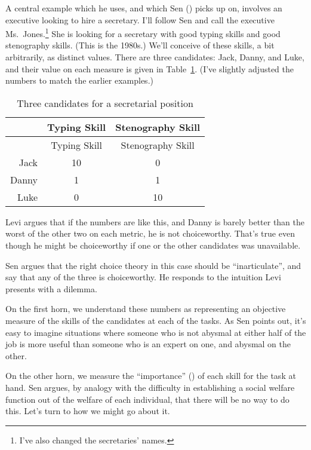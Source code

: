 \documentclass[
  10.5pt,
  twoside]{article}
\begin{document}
A central example which he uses, and which Sen
() picks up on, involves an executive
looking to hire a secretary. I'll follow Sen and call the executive
Ms.~Jones.\footnote{I've also changed the secretaries' names.} She is
looking for a secretary with good typing skills and good stenography
skills. (This is the 1980s.) We'll conceive of these skills, a bit
arbitrarily, as distinct values. There are three candidates: Jack,
Danny, and Luke, and their value on each measure is given in
Table~\ref{tbl-secretaries}. (I've slightly adjusted the numbers to
match the earlier examples.)

\begin{longtable}[]{@{}rcc@{}}
\caption{Three candidates for a secretarial
position}\label{tbl-secretaries}\tabularnewline
\toprule\noalign{}
& Typing Skill & Stenography Skill \\
\midrule\noalign{}
\endfirsthead
\toprule\noalign{}
& Typing Skill & Stenography Skill \\
\midrule\noalign{}
\endhead
\bottomrule\noalign{}
\endlastfoot
Jack & 10 & 0 \\
Danny & 1 & 1 \\
Luke & 0 & 10 \\
\end{longtable}

Levi argues that if the numbers are like this, and Danny is barely
better than the worst of the other two on each metric, he is not
choiceworthy. That's true even though he might be choiceworthy if one or
the other candidates was unavailable.

Sen argues that the right choice theory in this case should be
``inarticulate'', and say that any of the three is choiceworthy. He
responds to the intuition Levi presents with a dilemma.

On the first horn, we understand these numbers as representing an
objective measure of the skills of the candidates at each of the tasks.
As Sen points out, it's easy to imagine situations where someone who is
not abysmal at either half of the job is more useful than someone who is
an expert on one, and abysmal on the other.

On the other horn, we measure the ``importance''
() of each skill for the task at
hand. Sen argues, by analogy with the difficulty in establishing a
social welfare function out of the welfare of each individual, that
there will be no way to do this. Let's turn to how we might go about it.
\end{document}
